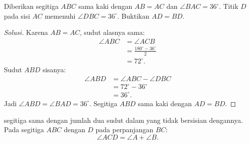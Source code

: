 \documentclass[12pt]{scrartcl}
\begin{document}
\begin{example}
Diberikan segitiga $ABC$ sama kaki dengan $AB = AC$ dan
$\angle BAC = 36^\circ$. Titik $D$ pada sisi $AC$ memenuhi
$\angle DBC = 36^\circ$. Buktikan $AD = BD$.
\begin{center}
\end{center}
\end{example}
\begin{proof}[Solusi]
Karena $AB = AC$, sudut alasnya sama:
\begin{align*}
\angle ABC &= \angle ACB \\
&= \frac{180^\circ - 36^\circ}{2} \\
&= 72^\circ.
\end{align*}
Sudut $ABD$ sisanya:
\begin{align*}
\angle ABD &= \angle ABC - \angle DBC \\
&= 72^\circ - 36^\circ \\
&= 36^\circ.
\end{align*}
Jadi $\angle ABD = \angle BAD = 36^\circ$. Segitiga $ABD$ sama kaki
dengan $AD = BD$.
\end{proof}

\begin{fact}
 segitiga sama dengan jumlah dua sudut
dalam yang tidak bersisian dengannya. Pada segitiga $ABC$ dengan $D$ pada
perpanjangan $BC$:
\[ \angle ACD = \angle A + \angle B. \]
\end{fact}
\end{document}
